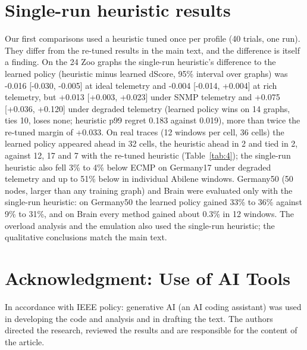 \documentclass[journal]{IEEEtran}
\begin{document}
\appendices
\section{Single-run heuristic results}
\label{app:A}
Our first comparisons used a heuristic tuned once per profile (40 trials, one run). They differ from the re-tuned results in the main text, and the difference is itself a finding. On the 24 Zoo graphs the single-run heuristic's difference to the learned policy (heuristic minus learned dScore, 95\% interval over graphs) was -0.016 [-0.030, -0.005] at ideal telemetry and -0.004 [-0.014, +0.004] at rich telemetry, but +0.013 [+0.003, +0.023] under SNMP telemetry and +0.075 [+0.036, +0.120] under degraded telemetry (learned policy wins on 14 graphs, ties 10, loses none; heuristic p99 regret 0.183 against 0.019), more than twice the re-tuned margin of +0.033. On real traces (12 windows per cell, 36 cells) the learned policy appeared ahead in 32 cells, the heuristic ahead in 2 and tied in 2, against 12, 17 and 7 with the re-tuned heuristic (Table~\ref{tab:4}); the single-run heuristic also fell 3\% to 4\% below ECMP on Germany17 under degraded telemetry and up to 51\% below in individual Abilene windows. Germany50 (50 nodes, larger than any training graph) and Brain were evaluated only with the single-run heuristic: on Germany50 the learned policy gained 33\% to 36\% against 9\% to 31\%, and on Brain every method gained about 0.3\% in 12 windows. The overload analysis and the emulation also used the single-run heuristic; the qualitative conclusions match the main text.

\section*{Acknowledgment: Use of AI Tools}
In accordance with IEEE policy: generative AI (an AI coding assistant) was used in developing the code and analysis and in drafting the text. The authors directed the research, reviewed the results and are responsible for the content of the article.
\end{document}
